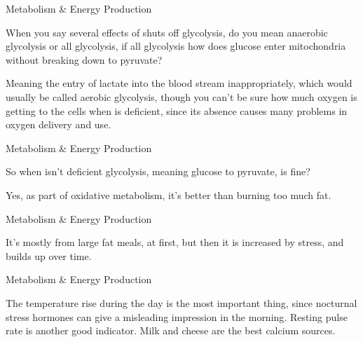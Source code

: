 \documentclass[11pt,oneside,openany,extrafontsizes]{memoir}
\begin{document}
\begin{qaexchange}{Metabolism \& Energy Production}

    \begin{question}
        When you say several effects of  shuts off glycolysis, do you mean anaerobic glycolysis or all glycolysis, if all glycolysis how does glucose enter mitochondria without breaking down to pyruvate?
    \end{question}

    \begin{answer}
        Meaning the entry of lactate into the blood stream inappropriately, which would usually be called aerobic glycolysis, though you can't be sure how much oxygen is getting to the cells when  is deficient, since its absence causes many problems in oxygen delivery and use.
    \end{answer}
\end{qaexchange}

\begin{qaexchange}{Metabolism \& Energy Production}

    \begin{question}
        So when  isn't deficient glycolysis, meaning glucose to pyruvate, is fine?
    \end{question}

    \begin{answer}
        Yes, as part of oxidative metabolism, it's better than burning too much fat.
    \end{answer}
\end{qaexchange}

\begin{standalonequote}{Metabolism \& Energy Production}

    \begin{answer}
        It's mostly from large fat meals, at first, but then it is increased by stress, and builds up over time.
    \end{answer}
\end{standalonequote}

\begin{standalonequote}{Metabolism \& Energy Production}

    \begin{answer}
        The temperature rise during the day is the most important thing, since nocturnal stress hormones can give a misleading impression in the morning. Resting pulse rate is another good indicator. Milk and cheese are the best calcium sources.
    \end{answer}
\end{standalonequote}
\end{document}
